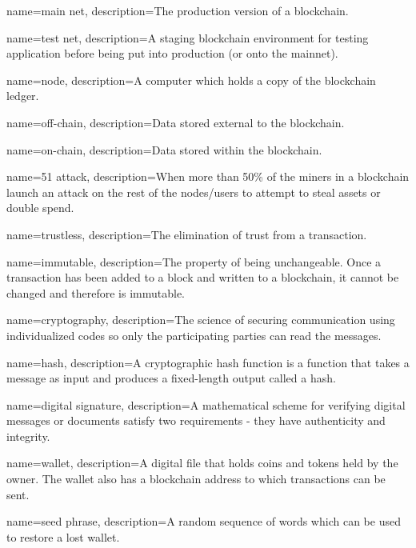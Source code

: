  {
	name=main net,
	description={The production version of a blockchain.}
}

 {
	name=test net,
	description={A staging blockchain environment for testing application before being put into production (or onto the mainnet).}
}

 {
	name=node,
	description={A computer which holds a copy of the blockchain ledger.}
}

 {
	name=off-chain,
	description={Data stored external to the blockchain.}
}

 {
	name=on-chain,
	description={Data stored within the blockchain.}
}


 {
	name=51 attack,
	description={When more than 50\% of the miners in a blockchain launch an attack on the rest of the nodes/users to attempt to steal assets or double spend.}
}

 {
	name=trustless,
	description={The elimination of trust from a transaction.}
}

 {
	name=immutable,
	description={The property of being unchangeable. Once a transaction has been added to a block and written to a blockchain, it cannot be changed and therefore is immutable.}
}

 {
	name=cryptography,
	description={The science of securing communication using individualized codes so only the participating parties can read the messages.}
}

 {
	name=hash,
	description={A cryptographic hash function is a function that takes a message as input and produces a fixed-length output called a hash.}
}

 {
	name=digital signature,
	description={A mathematical scheme for verifying digital messages or documents satisfy two requirements - they have authenticity and integrity.}
}

 {
	name=wallet,
	description={A digital file that holds coins and tokens held by the owner. The wallet also has a blockchain address to which transactions can be sent.}
}

 {
	name=seed phrase,
	description={A random sequence of words which can be used to restore a lost wallet.}
}

